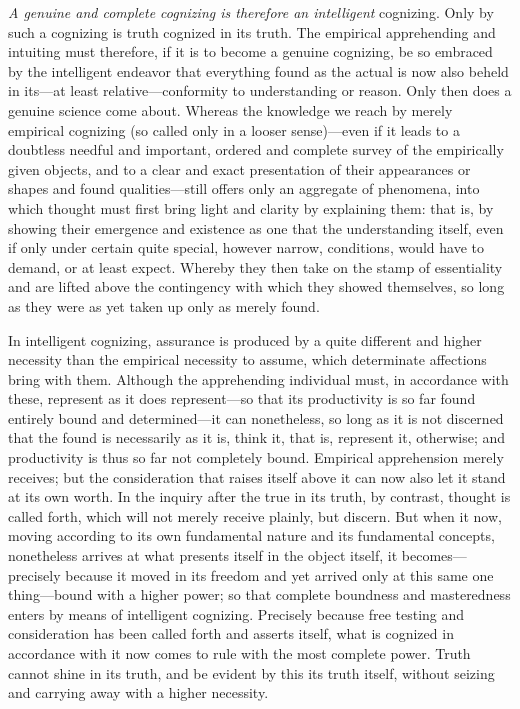 \documentclass[12pt,a4paper]{book}
\begin{document}
\emph{A genuine and complete cognizing is therefore an intelligent} cognizing.
Only by such a cognizing is truth cognized in its truth. The empirical
apprehending and intuiting must therefore, if it is to become a genuine
cognizing, be so embraced by the intelligent endeavor that everything found as the
actual is now also beheld in its---at least relative---conformity to understanding
or reason. Only then does a genuine science come about. Whereas the knowledge we
reach by merely empirical cognizing (so called only in a looser sense)---even if
it leads to a doubtless needful and important, ordered and complete survey of the
empirically given objects, and to a clear and exact presentation of their
appearances or shapes and found qualities---still offers only an aggregate of
phenomena, into which thought must first bring light and clarity by explaining
them: that is, by showing their emergence and existence as one that the
understanding itself, even if only under certain quite special, however narrow,
conditions, would have to demand, or at least expect. Whereby they then take on
the stamp of essentiality and are lifted above the contingency with which they
showed themselves, so long as they were as yet taken up only as merely found.

In intelligent cognizing, assurance is produced by a quite different and higher
necessity than the empirical necessity to assume, which determinate affections
bring with them. Although the apprehending individual must, in accordance with
these, represent as it does represent---so that its productivity is so far found
entirely bound and determined---it can nonetheless, so long as it is not discerned
that the found is necessarily as it is, think it, that is, represent it,
otherwise; and productivity is thus so far not completely bound. Empirical
apprehension merely receives; but the consideration that raises itself above it
can now also let it stand at its own worth. In the inquiry after the true in its
truth, by contrast, thought is called forth, which will not merely receive
plainly, but discern. But when it now, moving according to its own fundamental
nature and its fundamental concepts, nonetheless arrives at what presents itself
in the object itself, it becomes---precisely because it moved in its freedom and
yet arrived only at this same one thing---bound with a higher power; so that
complete boundness and masteredness enters by means of intelligent cognizing.
Precisely because free testing and consideration has been called forth and
asserts itself, what is cognized in accordance with it now comes to rule with the
most complete power. Truth cannot shine in its truth, and be evident by this its
truth itself, without seizing and carrying away with a higher necessity.
\end{document}
